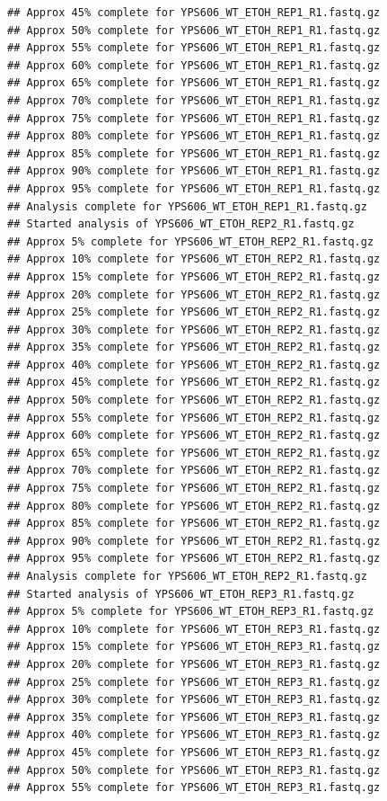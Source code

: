 \documentclass[
]{book}
\begin{document}
\begin{verbatim}
## Approx 45% complete for YPS606_WT_ETOH_REP1_R1.fastq.gz
## Approx 50% complete for YPS606_WT_ETOH_REP1_R1.fastq.gz
## Approx 55% complete for YPS606_WT_ETOH_REP1_R1.fastq.gz
## Approx 60% complete for YPS606_WT_ETOH_REP1_R1.fastq.gz
## Approx 65% complete for YPS606_WT_ETOH_REP1_R1.fastq.gz
## Approx 70% complete for YPS606_WT_ETOH_REP1_R1.fastq.gz
## Approx 75% complete for YPS606_WT_ETOH_REP1_R1.fastq.gz
## Approx 80% complete for YPS606_WT_ETOH_REP1_R1.fastq.gz
## Approx 85% complete for YPS606_WT_ETOH_REP1_R1.fastq.gz
## Approx 90% complete for YPS606_WT_ETOH_REP1_R1.fastq.gz
## Approx 95% complete for YPS606_WT_ETOH_REP1_R1.fastq.gz
## Analysis complete for YPS606_WT_ETOH_REP1_R1.fastq.gz
## Started analysis of YPS606_WT_ETOH_REP2_R1.fastq.gz
## Approx 5% complete for YPS606_WT_ETOH_REP2_R1.fastq.gz
## Approx 10% complete for YPS606_WT_ETOH_REP2_R1.fastq.gz
## Approx 15% complete for YPS606_WT_ETOH_REP2_R1.fastq.gz
## Approx 20% complete for YPS606_WT_ETOH_REP2_R1.fastq.gz
## Approx 25% complete for YPS606_WT_ETOH_REP2_R1.fastq.gz
## Approx 30% complete for YPS606_WT_ETOH_REP2_R1.fastq.gz
## Approx 35% complete for YPS606_WT_ETOH_REP2_R1.fastq.gz
## Approx 40% complete for YPS606_WT_ETOH_REP2_R1.fastq.gz
## Approx 45% complete for YPS606_WT_ETOH_REP2_R1.fastq.gz
## Approx 50% complete for YPS606_WT_ETOH_REP2_R1.fastq.gz
## Approx 55% complete for YPS606_WT_ETOH_REP2_R1.fastq.gz
## Approx 60% complete for YPS606_WT_ETOH_REP2_R1.fastq.gz
## Approx 65% complete for YPS606_WT_ETOH_REP2_R1.fastq.gz
## Approx 70% complete for YPS606_WT_ETOH_REP2_R1.fastq.gz
## Approx 75% complete for YPS606_WT_ETOH_REP2_R1.fastq.gz
## Approx 80% complete for YPS606_WT_ETOH_REP2_R1.fastq.gz
## Approx 85% complete for YPS606_WT_ETOH_REP2_R1.fastq.gz
## Approx 90% complete for YPS606_WT_ETOH_REP2_R1.fastq.gz
## Approx 95% complete for YPS606_WT_ETOH_REP2_R1.fastq.gz
## Analysis complete for YPS606_WT_ETOH_REP2_R1.fastq.gz
## Started analysis of YPS606_WT_ETOH_REP3_R1.fastq.gz
## Approx 5% complete for YPS606_WT_ETOH_REP3_R1.fastq.gz
## Approx 10% complete for YPS606_WT_ETOH_REP3_R1.fastq.gz
## Approx 15% complete for YPS606_WT_ETOH_REP3_R1.fastq.gz
## Approx 20% complete for YPS606_WT_ETOH_REP3_R1.fastq.gz
## Approx 25% complete for YPS606_WT_ETOH_REP3_R1.fastq.gz
## Approx 30% complete for YPS606_WT_ETOH_REP3_R1.fastq.gz
## Approx 35% complete for YPS606_WT_ETOH_REP3_R1.fastq.gz
## Approx 40% complete for YPS606_WT_ETOH_REP3_R1.fastq.gz
## Approx 45% complete for YPS606_WT_ETOH_REP3_R1.fastq.gz
## Approx 50% complete for YPS606_WT_ETOH_REP3_R1.fastq.gz
## Approx 55% complete for YPS606_WT_ETOH_REP3_R1.fastq.gz

\end{verbatim}
\end{document}
